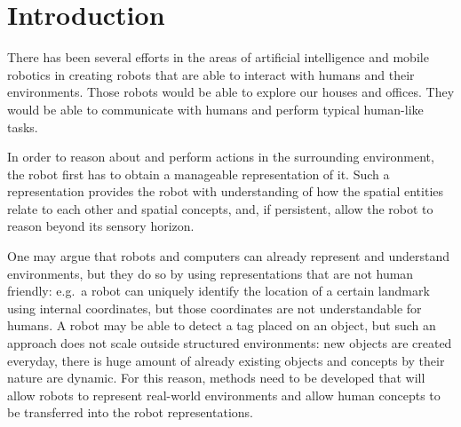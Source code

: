 \chapter{Introduction}

%

There has been several efforts in the areas of artificial intelligence and mobile robotics
in creating robots that are able to interact with humans and their environments.
Those robots would be able to explore our houses and offices. They would be able to communicate
with humans and perform typical human-like tasks.



In order to reason about and perform actions in the surrounding environment, the robot first 
has to obtain a manageable representation of it. Such a representation provides the robot with 
understanding of how the spatial entities relate to each other and spatial concepts, and, 
if persistent, allow the robot to reason beyond its sensory horizon.

One may argue that robots and computers can already represent and understand environments, but they
do so by using representations that are not human friendly: e.g.\ a robot can uniquely identify the
location of a certain landmark using internal coordinates, but those coordinates are not understandable
for humans. A robot may be able to detect a tag placed on an object, but such an approach does not scale
outside structured environments: new objects are created everyday, there is huge amount of already
existing objects and concepts by their nature are dynamic. For this reason, methods need 
to be developed that will allow robots to represent real-world environments and allow human concepts
to be transferred into the robot representations.

